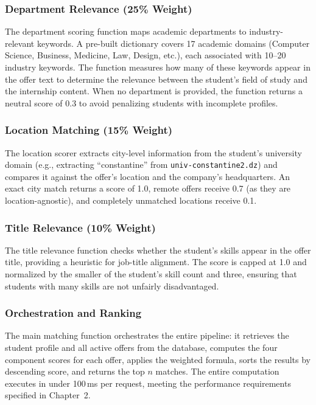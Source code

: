 \subsubsection{Department Relevance (25\% Weight)}

The department scoring function maps academic departments to industry-relevant keywords. A pre-built dictionary covers 17 academic domains (Computer Science, Business, Medicine, Law, Design, etc.), each associated with 10--20 industry keywords. The function measures how many of these keywords appear in the offer text to determine the relevance between the student's field of study and the internship content. When no department is provided, the function returns a neutral score of 0.3 to avoid penalizing students with incomplete profiles.

\subsubsection{Location Matching (15\% Weight)}

The location scorer extracts city-level information from the student's university domain (e.g., extracting ``constantine'' from \texttt{univ-constantine2.dz}) and compares it against the offer's location and the company's headquarters. An exact city match returns a score of 1.0, remote offers receive 0.7 (as they are location-agnostic), and completely unmatched locations receive 0.1.

\subsubsection{Title Relevance (10\% Weight)}

The title relevance function checks whether the student's skills appear in the offer title, providing a heuristic for job-title alignment. The score is capped at 1.0 and normalized by the smaller of the student's skill count and three, ensuring that students with many skills are not unfairly disadvantaged.

\subsubsection{Orchestration and Ranking}

The main matching function orchestrates the entire pipeline: it retrieves the student profile and all active offers from the database, computes the four component scores for each offer, applies the weighted formula, sorts the results by descending score, and returns the top $n$ matches. The entire computation executes in under 100\,ms per request, meeting the performance requirements specified in Chapter~2.

